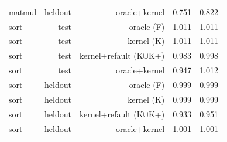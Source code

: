 \begin{tabular}{lrrrr}
matmul & heldout & oracle{+}kernel & 0.751 & 0.822 \\
sort & test & oracle (F) & 1.011 & 1.011 \\
sort & test & kernel (K) & 1.011 & 1.011 \\
sort & test & kernel{+}refault (K$\cup$K{+}) & 0.983 & 0.998 \\
sort & test & oracle{+}kernel & 0.947 & 1.012 \\
sort & heldout & oracle (F) & 0.999 & 0.999 \\
sort & heldout & kernel (K) & 0.999 & 0.999 \\
sort & heldout & kernel{+}refault (K$\cup$K{+}) & 0.933 & 0.951 \\
sort & heldout & oracle{+}kernel & 1.001 & 1.001 \\
\bottomrule
\end{tabular}
